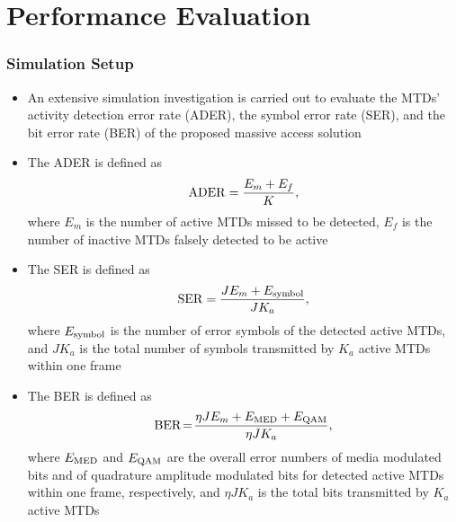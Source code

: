 \documentclass[9pt]{beamer}
\begin{document}
\section{Performance Evaluation}
\begin{frame}
\frametitle{Simulation Setup}
\begin{itemize}
\item
An extensive simulation investigation is carried out to evaluate the MTDs' activity detection error rate (ADER), the symbol error rate (SER), and the bit error rate (BER) of the proposed massive access solution
\item
The ADER is defined as
\begin{equation}\label{eq:postTotal}
\begin{array}{l}
{\rm ADER}=\dfrac{E_m+E_f}{K},
\end{array}
\end{equation}
where $E_m$ is the number of active MTDs missed to be detected, $E_f$ is the number of inactive MTDs falsely detected to be active
\item
The SER is defined as
\begin{equation}\label{eq:postTotal}
\begin{array}{l}
{\rm SER}=\dfrac{JE_m+E_{\rm symbol}}{J K_a},
\end{array}
\end{equation}
where $E_{\rm symbol}$ is the number of error symbols of the detected active MTDs, and $J K_a $ is the total number of symbols transmitted by $K_a$ active MTDs within one frame
\item
The BER is defined as
\begin{equation}\label{eq:postTotal}
\begin{array}{l}
{\rm BER}\!=\!\dfrac{\eta J E_m +E_{\rm MED}+E_{\rm QAM}}{\eta J K_a },
\end{array}
\end{equation}
where $E_{\rm MED}$ and $E_{\rm QAM}$ are the overall error numbers of media modulated bits and of quadrature amplitude modulated bits for detected active MTDs within one frame, respectively, and $\eta J K_a$ is the total bits transmitted by $K_a$ active MTDs
\end{itemize}
\end{frame}
\end{document}
